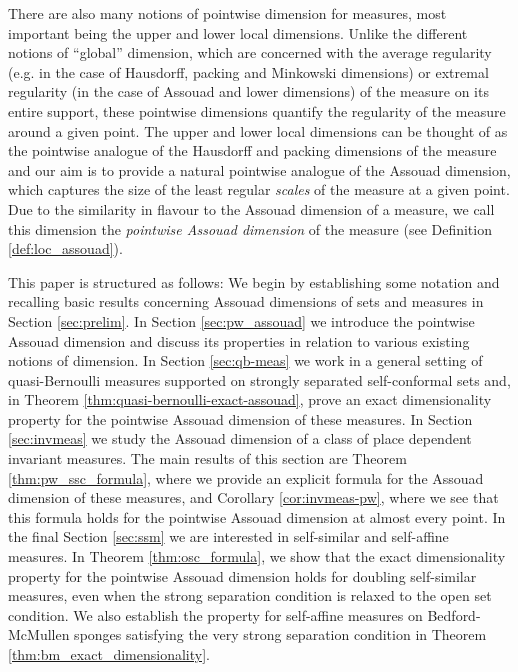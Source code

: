 \documentclass{PRM}
\theoremstyle{plain}
\theoremstyle{definition}
\theoremstyle{remark}
\begin{document}
There are also many notions of pointwise dimension for measures, most important being the upper and lower local dimensions. Unlike the different notions of ``global'' dimension, which are concerned with the average regularity (e.g. in the case of Hausdorff, packing and Minkowski dimensions) or extremal regularity (in the case of Assouad and lower dimensions) of the measure on its entire support, these pointwise dimensions quantify the regularity of the measure around a given point. The upper and lower local dimensions can be thought of as the pointwise analogue of the Hausdorff and packing dimensions of the measure and our aim is to provide a natural pointwise analogue of the Assouad dimension, which captures the size of the least regular \emph{scales} of the measure at a given point. Due to the similarity in flavour to the Assouad dimension of a measure, we call this dimension the \emph{pointwise Assouad dimension} of the measure (see Definition \ref{def:loc_assouad}).

This paper is structured as follows: We begin by establishing some notation and recalling basic results concerning Assouad dimensions of sets and measures in Section \ref{sec:prelim}. In Section \ref{sec:pw_assouad} we introduce the pointwise Assouad dimension and discuss its properties in relation to various existing notions of dimension. In Section \ref{sec:qb-meas} we work in a general setting of quasi-Bernoulli measures supported on strongly separated self-conformal sets and, in Theorem \ref{thm:quasi-bernoulli-exact-assouad}, prove an exact dimensionality property for the pointwise Assouad dimension of these measures. In Section \ref{sec:invmeas} we study the Assouad dimension of a class of place dependent invariant measures. The main results of this section are Theorem \ref{thm:pw_ssc_formula}, where we provide an explicit formula for the Assouad dimension of these measures, and Corollary \ref{cor:invmeas-pw}, where we see that this formula holds for the pointwise Assouad dimension at almost every point. In the final Section \ref{sec:ssm} we are interested in self-similar and self-affine measures. In Theorem \ref{thm:osc_formula}, we show that the exact dimensionality property for the pointwise Assouad dimension holds for doubling self-similar measures, even when the strong separation condition is relaxed to the open set condition. We also establish the property for self-affine measures on Bedford-McMullen sponges satisfying the very strong separation condition in Theorem \ref{thm:bm_exact_dimensionality}.
\end{document}
